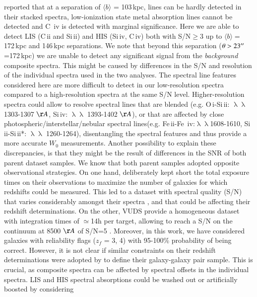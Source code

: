 \documentclass[longauth]{aa}
\begin{document}
\cite{Steidel10} reported that at a separation of $\langle b \rangle$ =
103\,kpc, lines can be hardly detected in their stacked spectra,
low-ionization state metal absorption lines cannot be detected and C\,
{\sc iv} is detected with marginal significance. Here we are able to detect
LIS (C\,{\sc ii} and Si\,{\sc ii}) and HIS (Si\,{\sc iv}, C\,{\sc iv}) both
with S/N$\geq3$ up to $\langle b \rangle=$\,172\,kpc and 146\,kpc
separations. We note that beyond this separation
($\theta>23^{\prime\prime}$=172\,kpc) we are unable to detect any significant signal
from the \textit{background} composite spectra. This might be caused by
differences in the S/N and resolution of the individual spectra used in the
two analyses. The spectral line features considered here are more difficult
to detect in our low-resolution spectra compared to a high-resolution
spectra at the same S/N level. Higher-resolution spectra could allow to
resolve spectral lines that are blended (e.g. O\,{\sc i}-Si\,{\sc ii}:
$\uplambda\uplambda$ 1303-1307 $\AA$, Si\,{\sc iv}: $\uplambda\uplambda$
1393-1402 $\AA$), or that are affected by close
photospheric/interstellar/nebular spectral lines(e.g. Fe\,{\sc ii}-Fe\,
{\sc iv}:$\uplambda\uplambda$1608-1610, Si\,{\sc ii}-Si\,{\sc ii}*:
$\uplambda\uplambda$ 1260-1264), disentangling the spectral features and
thus provide a more accurate $W_{0}$ measurements. Another possibility to
explain these discrepancies, is that they might be the result of differences
in the SNR of both parent dataset samples. We know that both parent samples
adopted opposite observational strategies. On one hand, 
\cite{Steidel04} deliberately kept short the total exposure times on their
observations to maximize the number of galaxies for which redshifts could be
measured. This led to a dataset with spectral quality (S/N) that varies
considerably amongst their spectra \citep{Steidel04,Steidel10}, and that
could be affecting their redshift determinations. On the other, VUDS provide
a homogeneous dataset with integration times of $\simeq $14h per target,
allowing to reach a S/N on the continuum at 8500 $\AA$ of S/N=5 \citep
{LeFevre15}. Moreover, in this work, we have considered galaxies with
reliability flags ($z_{f}$ = 3, 4) with 95-100\% probability of being
correct. However, it is not clear if similar constraints on their redshift
determinations were adopted by \cite{Steidel10} to define their
galaxy-galaxy pair sample. This is crucial, as composite spectra can be
affected by spectral offsets in the individual spectra. LIS and HIS spectral
absorptions could be washed out or artificially boosted by considering
\end{document}
